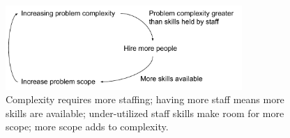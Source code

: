 \begin{center}
\begin{figure}[ht]
    \centering
    \includegraphics[width=0.8\textwidth]{images/feedback_loop_complexity_and_staffing}
    \caption{Complexity requires more staffing; having more staff means more skills are available; under-utilized staff skills make room for more scope; more scope adds to complexity.}
    \label{fig:complexity_and_staff_growth}
\end{figure}
\end{center}
